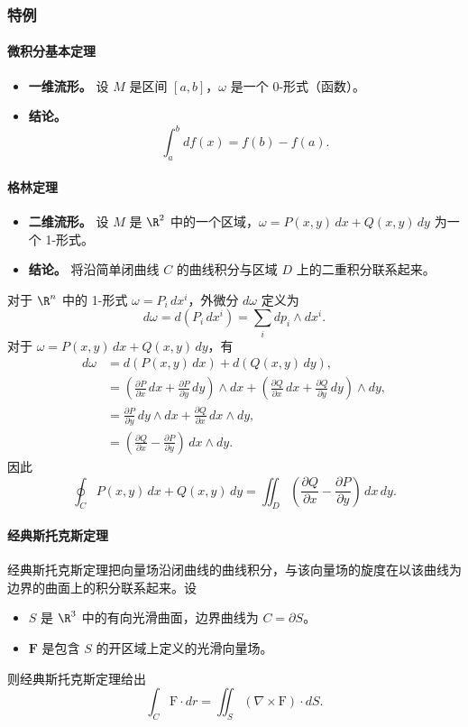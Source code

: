 \subsubsection{特例}
\paragraph{微积分基本定理}
\begin{itemize}
\item \textbf{一维流形。} 设 $M$ 是区间 $[a,b]$，$\omega$ 是一个 0-形式（函数）。
\item \textbf{结论。}
\[
  \int_a^b df(x)=f(b)-f(a).
\]
\end{itemize}

\paragraph{格林定理}
\begin{itemize}
\item \textbf{二维流形。} 设 $M$ 是 $\R^2$ 中的一个区域，$\omega=P(x,y)\,dx+Q(x,y)\,dy$ 为一个 1-形式。
\item \textbf{结论。} 将沿简单闭曲线 $C$ 的曲线积分与区域 $D$ 上的二重积分联系起来。
\end{itemize}

对于 $\R^n$ 中的 1-形式 $\omega=P_i\,dx^i$，外微分 $d\omega$ 定义为
\[
  d\omega=d(P_i\,dx^i)=\sum_i dp_i\wedge dx^i.
\]
对于 $\omega=P(x,y)\,dx+Q(x,y)\,dy$，有
\begin{align*}
  d\omega&=d(P(x,y)\,dx)+d(Q(x,y)\,dy),\\
  &=\left(\frac{\partial P}{\partial x}\,dx+\frac{\partial P}{\partial y}\,dy\right)\wedge dx
    +\left(\frac{\partial Q}{\partial x}\,dx+\frac{\partial Q}{\partial y}\,dy\right)\wedge dy,\\
  &=\frac{\partial P}{\partial y}\,dy\wedge dx+\frac{\partial Q}{\partial x}\,dx\wedge dy,\\
  &=\left(\frac{\partial Q}{\partial x}-\frac{\partial P}{\partial y}\right)\,dx\wedge dy.
\end{align*}
因此
\begin{equation*}
  \oint_C P(x,y)\,dx+Q(x,y)\,dy
  =\iint_D\left(\frac{\partial Q}{\partial x}-\frac{\partial P}{\partial y}\right)\,dx\,dy.
  \tag{3.1}\label{eq:3.1}
\end{equation*}

\paragraph{经典斯托克斯定理}
经典斯托克斯定理把向量场沿闭曲线的曲线积分，与该向量场的旋度在以该曲线为边界的曲面上的积分联系起来。设
\begin{itemize}
\item $S$ 是 $\R^3$ 中的有向光滑曲面，边界曲线为 $C=\partial S$。
\item $\symbf{F}$ 是包含 $S$ 的开区域上定义的光滑向量场。
\end{itemize}
则经典斯托克斯定理给出
\begin{equation*}
  \int_C\mathrm{F}\cdot dr=\iint_S(\nabla\times\mathrm{F})\cdot dS.
  \tag{3.2}\label{eq:3.2}
\end{equation*}

